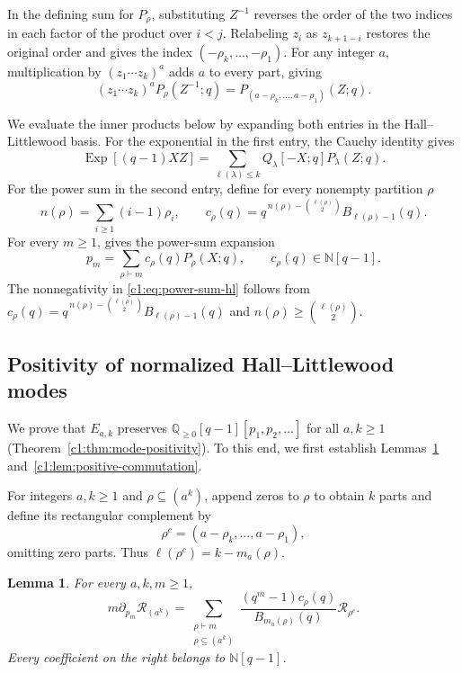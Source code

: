 \documentclass[12pt,reqno,a4paper]{amsart}
\numberwithin{equation}{section}
\numberwithin{figure}{section}
\theoremstyle{plain}
\newtheorem{lemma}[theorem]{Lemma}
\theoremstyle{definition}
\begin{document}
In the defining sum for $P_\rho$, substituting $Z^{-1}$
reverses the order of the two indices in each factor of the product over $i<j$.
Relabeling $z_i$ as $z_{k+1-i}$ restores the original order and gives the index
$(-\rho_k,\ldots,-\rho_1)$.  For any integer $a$, multiplication by
$(z_1\cdots z_k)^a$ adds $a$ to every part, giving
\begin{equation}\label{c1:eq:rectangle-inversion}
 (z_1\cdots z_k)^aP_\rho(Z^{-1};q)
 =P_{(a-\rho_k,\ldots,a-\rho_1)}(Z;q).
\end{equation}

We evaluate the inner products below by expanding both entries in the
Hall--Littlewood basis.  For the exponential in the first entry, the
Cauchy identity gives
\begin{equation}\label{c1:eq:hl-cauchy}
 \operatorname{Exp}[(q-1)XZ]
 =\sum_{\ell(\lambda)\leq k}
     Q_\lambda[-X;q]P_\lambda(Z;q).
\end{equation}
For the power sum in the second entry, define for every nonempty
partition $\rho$
\[
 n(\rho)=\sum_{i\geq1}(i-1)\rho_i,
 \qquad
 c_\rho(q)
 =q^{\,n(\rho)-\binom{\ell(\rho)}2}
     B_{\ell(\rho)-1}(q).
\]
For every $m\geq1$, \cite[Chapter~III, \S7, Example~2, p.~248]{Macdonald}
gives the power-sum expansion
\begin{equation}\label{c1:eq:power-sum-hl}
 p_m=\sum_{\rho\vdash m}c_\rho(q)P_\rho(X;q),
 \qquad c_\rho(q)\in\mathbb N[q-1].
\end{equation}
The nonnegativity in \eqref{c1:eq:power-sum-hl} follows from
$c_\rho(q)=q^{\,n(\rho)-\binom{\ell(\rho)}2}B_{\ell(\rho)-1}(q)$
and $n(\rho)\geq\binom{\ell(\rho)}2$.

\subsection{Positivity of normalized Hall--Littlewood modes}
\label{c1:subsec:operator-positivity}

We prove that $E_{a,k}$ preserves $\mathbb Q_{\geq0}[q-1][p_1,p_2,\ldots]$
for all $a,k\geq1$ (Theorem~\ref{c1:thm:mode-positivity}).
To this end, we first establish Lemmas~\ref{c1:lem:rectangle-lowering}
and~\ref{c1:lem:positive-commutation}.

For integers $a,k\geq1$ and $\rho\subseteq(a^k)$, append zeros to
$\rho$ to obtain $k$ parts and define its rectangular complement by
\[
 \rho^c=(a-\rho_k,\ldots,a-\rho_1),
\]
omitting zero parts.  Thus $\ell(\rho^c)=k-m_a(\rho)$.

\begin{lemma}\label{c1:lem:rectangle-lowering}
For every $a,k,m\geq1$,
\begin{equation}\label{c1:eq:rectangle-lowering}
 m\partial_{p_m}\mathcal R_{(a^k)}
 =\sum_{\substack{\rho\vdash m\\\rho\subseteq(a^k)}}
    \frac{(q^m-1)c_\rho(q)}{B_{m_a(\rho)}(q)}
    \mathcal R_{\rho^c}.
\end{equation}
Every coefficient on the right belongs to $\mathbb N[q-1]$.
\end{lemma}
\end{document}
